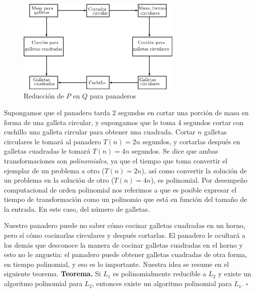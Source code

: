 \documentclass[11 pt, a4paper]{article}
\theoremstyle{definition}
\begin{document}
\begin{enumerate}
            \begin{figure}[h]
                \includegraphics[width=80mm]{Reduc_P_en_Q_Pan.png}
                \centering
                \caption{Reducci\'on de $P$ en $Q$ para panaderos}
                \label{fig:PQ_Red_Pan}
            \end{figure}

            Supongamos que el panadero tarda 2 segundos en cortar una porción de masa en forma de una galleta circular,
            y supongamos que le toma 4 segundos cortar con cuchillo una galleta circular para obtener una cuadrada.
            Cortar $n$ galletas circulares le tomar\'a al panadero $T(n) = 2n$ segundos, y cortarlas despu\'es en galletas
            cuadradas le tomar\'a $T(n) = 4n$ segundos. Se dice que ambas transformaciones son \emph{polinomiales}, ya
            que el tiempo que toma convertir el ejemplar de un problema a otro ($T(n) = 2n$), as\'i como convertir la soluci\'on de un problema en la soluci\'on de otro ($T(n) = 4n$), es polinomial. Por desempe\~no computacional de orden polinomial nos referimos a que es posible expresar el tiempo de transformaci\'on como un polinomio que est\'a en funci\'on del tama\~no de la entrada. En este caso, del n\'umero de galletas. \par

            Nuestro panadero puede no saber c\'omo cocinar galletas cuadradas en un horno, pero s\'i c\'omo cocinarlas
            circulares y despu\'es cortarlas. El panadero le ocultar\'a a los dem\'as que desconoce la manera de cocinar galletas cuadradas en el horno y esto no le angustia: el panadero puede obtener galletas cuadradas de otra forma, en tiempo polinomial, y eso es lo importante. Nuestra idea se resume en el siguiente teorema.
            \textbf{Teorema.} Si $L_1$ es polinomialmente reducible a $L_2$ y existe un algoritmo polinomial para $L_2$, entonces existe un algoritmo polinomial para $L_1$. $\square$ \\


\end{enumerate}
\end{document}
